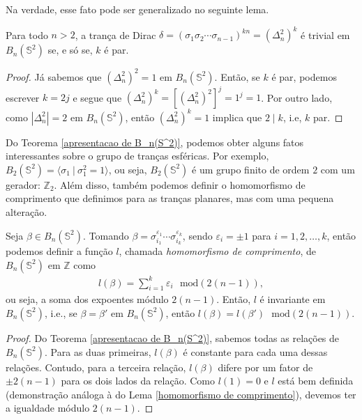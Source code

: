 	\par\vspace{0.3cm} Na verdade, esse fato pode ser generalizado no seguinte lema.
	\begin{lemma}
	\label{potencia da volta completa trivial}
		Para todo $n> 2$, a trança de Dirac 
		$\delta = (\sigma_1\sigma_2\cdots\sigma_{n-1})^{kn} = (\Delta_n^2)^k$ 
		é trivial em $B_n(\mathbb{S}^2)$ se, e só se, $k$ é par. 
	\end{lemma}
	\begin{proof}
		Já sabemos que $(\Delta_n^2)^2 = 1$ em $B_n(\mathbb{S}^2)$. Então, se $k$ é par, 
		podemos escrever $k=2j$ e segue que $(\Delta_n^2)^k = [(\Delta_n^2)^2]^j = 1^j = 1$. 
		Por outro lado, como $|\Delta_n^2| = 2$ em $B_n(\mathbb{S}^2)$, então $(\Delta_n^2)^k = 1$ 
		implica que $2\mid k$, i.e, $k$ par.
	\end{proof}
	Do Teorema \ref{apresentacao de B_n(S^2)}, podemos obter alguns fatos interessantes sobre 
	o grupo de tranças esféricas. Por exemplo, 
	$B_2(\mathbb{S}^2) = \langle \sigma_1 \ | \ \sigma_1^2=1 \rangle$, ou seja, $B_2(\mathbb{S}^2)$ 
	é um grupo finito de ordem $2$ com um gerador: $\mathbb{Z}_2$. Além disso, também podemos definir 
	o homomorfismo de comprimento que definimos para as tranças planares, mas com uma pequena alteração.
	\begin{prop}
	\label{homomorfismo de comprimento em trancas esfericas}
		Seja $\beta\in B_n(\mathbb{S}^2)$. 
		Tomando $\beta = \sigma_{i_1}^{\varepsilon_1}\cdots\sigma_{i_k}^{\varepsilon_k}$, 
		sendo $\varepsilon_i = \pm1$ para $i=1,2,\dots,k$, então podemos definir a função $l$, 
		chamada \textit{homomorfismo de comprimento}, de $B_n(\mathbb{S}^2)$ em $\mathbb{Z}$ como	
		\begin{align*}
		    l(\beta) = \sum_{i=1}^{k}\varepsilon_i\text{ }\mathrm{mod}(2(n-1)),
		\end{align*}
		ou seja, a soma dos expoentes módulo $2(n-1)$. Então, $l$ é invariante 
		em $B_n(\mathbb{S}^2)$, i.e., se $\beta = \beta'$ em $B_n(\mathbb{S}^2)$, 
		então $l(\beta) = l(\beta')\text{ }\mathrm{mod}(2(n-1))$.
	\end{prop}
	\begin{proof}
		Do Teorema \ref{apresentacao de B_n(S^2)}, sabemos todas as relações de $B_n(\mathbb{S}^2)$. 
		Para as duas primeiras, $l(\beta)$ é constante para cada uma dessas relações. 
		Contudo, para a terceira relação, $l(\beta)$ difere por um fator de $\pm2(n-1)$ para os 
		dois lados da relação. Como $l(1) = 0$ e $l$ está bem definida (demonstração análoga à 
		do Lema \ref{homomorfismo de comprimento}), devemos ter a igualdade módulo $2(n-1)$.
	\end{proof}
